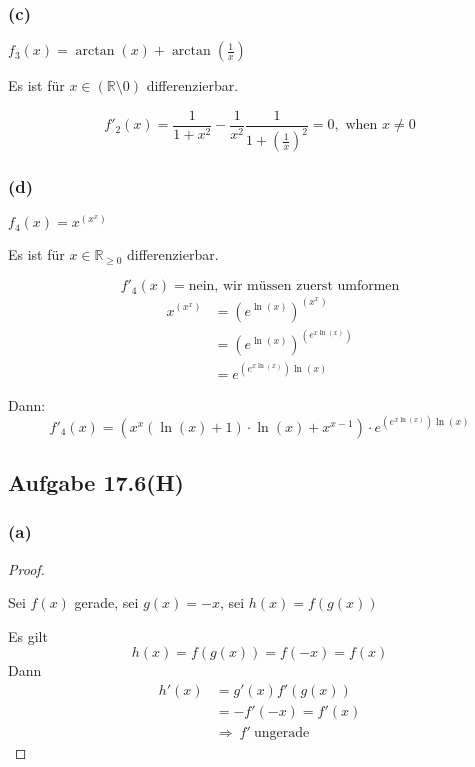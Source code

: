 \subsubsection{(c)}

$f_3(x)=\arctan(x)+\arctan(\frac{1}{x})$

Es ist für $x\in(\mathbb{R}\setminus{0})$ differenzierbar.

\begin{equation*}
f'_2(x)=\frac{1}{1+x^2}-\frac{1}{x^2}\frac{1}{1+(\frac{1}{x})^2}=0,\mbox{ when }x\neq0
\end{equation*}

\subsubsection{(d)}

$f_4(x)=x^{(x^x)}$

Es ist für $x\in\mathbb{R}_{\geq0}$ differenzierbar.

\begin{equation*}
f'_4(x)=\mbox{nein, wir müssen zuerst umformen}
\end{equation*}
\begin{align*}
x^{(x^x)}&=(e^{\ln(x)})^{(x^x)}\\
&=(e^{\ln(x)})^{(e^{x\ln(x)})}\\
&=e^{(e^{x\ln(x)})\ln(x)}
\end{align*}

Dann:
\begin{equation*}
f'_4(x)=(x^x(\ln(x)+1)\cdot\ln(x)+x^{x-1})\cdot e^{(e^{x\ln(x)})\ln(x)}
\end{equation*}

\newpage

\subsection{Aufgabe 17.6(H)}

\subsubsection{(a)}

\begin{proof}
$ $\newline

Sei $f(x)$ gerade, sei $g(x)=-x$, sei $h(x)=f(g(x))$

Es gilt
\begin{equation*}
h(x)=f(g(x))=f(-x)=f(x)
\end{equation*}
Dann
\begin{align*}
h'(x)&=g'(x)f'(g(x))\\
&=-f'(-x)=f'(x)\\
&\Rightarrow\ f'\ \mbox{ungerade}
\end{align*}
\end{proof}

